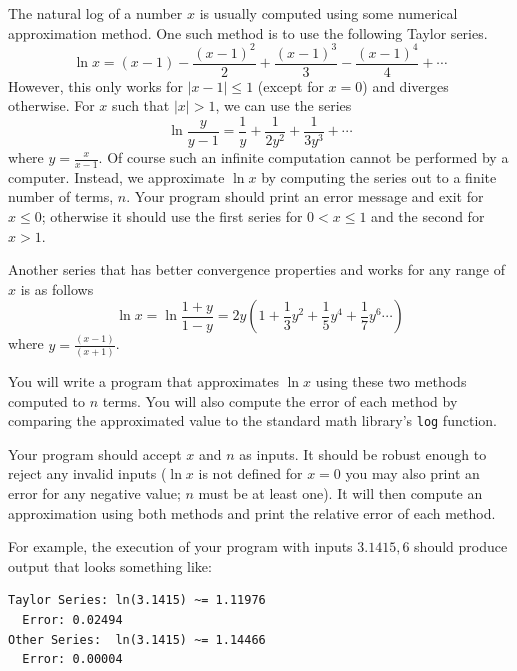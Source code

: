 \begin{exer}
The natural log of a number $x$ is usually computed using some numerical
approximation method.  One such method is to use the following Taylor series.
  $$\ln{x} = (x-1) - \frac{(x-1)^2}{2} + \frac{(x-1)^3}{3} - \frac{(x-1)^4}{4} + \cdots$$
However, this only works for $|x-1| \leq 1$ (except for $x=0$) and diverges otherwise.  
For $x$ such that $|x| > 1$, we can use the series
  $$\ln{\frac{y}{y-1}} = \frac{1}{y} + \frac{1}{2y^2} + \frac{1}{3y^3} + \cdots$$
where $y = \frac{x}{x-1}$.  Of course such an infinite computation cannot be performed
by a computer.  Instead, we approximate $\ln{x}$ by computing the series out to a finite number
of terms, $n$.  Your program should print an error message and exit for $x \leq 0$; otherwise it should use the 
first series for $0 < x \leq 1$ and the second for $x > 1$.

Another series that has better convergence properties and works for any range of $x$
is as follows
 $$\ln{x} = \ln{\frac{1+y}{1-y}} = 2y\left(1 + \frac{1}{3}y^2 + \frac{1}{5}y^4 + \frac{1}{7}y^6 \cdots\right)$$
where $y = \frac{(x-1)}{(x+1)}$.

You will write a program that approximates $\ln{x}$ using these two methods computed to
$n$ terms.  You will also compute the error of each method by comparing the approximated
value to the standard math library's \texttt{log} function.

Your program should accept $x$ and $n$ as inputs.  It should be robust enough to
reject any invalid inputs ($\ln{x}$ is not defined for $x = 0$ you may also print an error for any
negative value; $n$ must be at least one).  It will then compute an approximation using both
methods and print the relative error of each method.

For example, the execution of your program with inputs $3.1415, 6$ should 
produce output that looks something like:

\begin{verbatim}
Taylor Series: ln(3.1415) ~= 1.11976  
  Error: 0.02494
Other Series:  ln(3.1415) ~= 1.14466  
  Error: 0.00004
\end{verbatim}
\end{exer}

